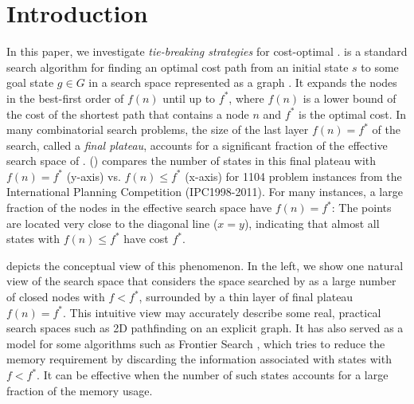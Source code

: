 
\section{Introduction}
\label{sec:introduction}

In this paper, we investigate \emph{tie-breaking strategies} for cost-optimal \astar.
\astar is a standard search algorithm for finding an optimal cost path from an initial state $s$ to some goal
state $g \in G$ in a search space represented as a graph \cite{hart1968formal}.
It expands the nodes in the best-first order of $f(n)$ until up to $f^*$,
where $f(n)$ is a lower bound of the cost of the shortest path that contains a node $n$ and $f^*$ is the optimal cost.
% 
In many combinatorial search problems, the size of the last layer $f(n)=f^*$ of the search, called a \emph{final plateau},
accounts for a significant fraction of the effective search space of \astar.  
() compares the number of states in this final plateau with $f(n) = f^*$ (y-axis)
vs. $f(n) \leq f^*$ (x-axis) for 1104 problem instances from the International Planning Competition (IPC1998-2011).
For many instances, a large fraction of the nodes in the effective search space have $f(n)=f^*$: The points
are located very close to the diagonal line ($x=y$), indicating that almost all states with $f(n) \leq f^*$ have cost
$f^*$.

 depicts the conceptual view of this phenomenon.
% 
In the left, we show 
one natural  %
view of the search space that considers the space searched by \astar as
a large number of closed nodes with $f<f^*$, surrounded by
a thin layer of final plateau $f(n)=f^*$.  This intuitive view
may accurately describe some real, practical search spaces such as 2D pathfinding on an explicit
graph.
% 
It has also served as a model for some algorithms such as Frontier Search \cite{korf1999divide,korf2000divide},
which tries to reduce the memory requirement by discarding the information associated with states with $f<f^*$.
It can be effective when the number of such states accounts for a large fraction of the memory usage.
 
